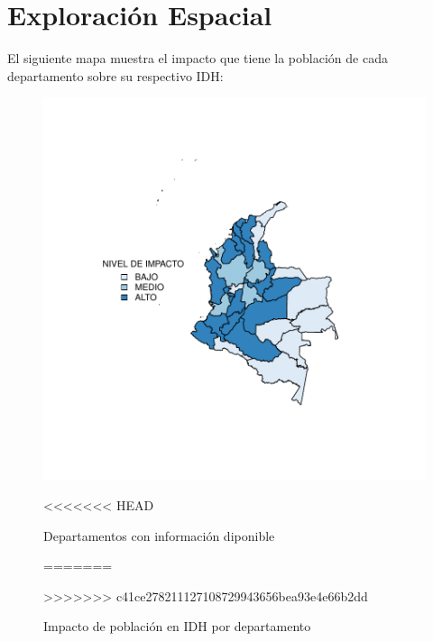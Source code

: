\documentclass{article}
\begin{document}




\section{Exploración Espacial}

El siguiente mapa muestra el impacto que tiene la población de cada departamento sobre su respectivo IDH:








 
 
\begin{figure}[h]
\centering
\begin{adjustbox}{width=8cm,height=6cm,clip,trim=1.5cm 2cm 0cm 2.5cm}
\includegraphics{basico32departamentos-plotMap0}
\end{adjustbox}
<<<<<<< HEAD
\caption{Departamentos con información diponible}\label{rawmap}
=======
\caption{Impacto de población en IDH por departamento}\label{rawmap}
>>>>>>> c41ce278211127108729943656bea93e4e66b2dd
\end{figure}
\end{document}
